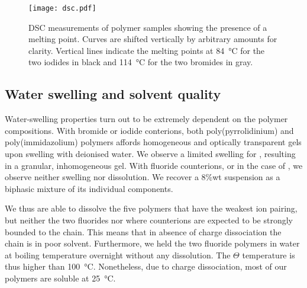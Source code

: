 \documentclass[journal=jacsat,manuscript=article]{achemso}
\begin{document}
\begin{figure}
\texttt{[image: dsc.pdf]}
\caption{DSC measurements of polymer samples showing the presence of a melting point. Curves are shifted vertically by arbitrary amounts for clarity. Vertical lines indicate the melting points at \SI{84}{\celsius} for the two iodides in black and \SI{114}{\celsius} for the two bromides in gray.}
\label{fig:dsc}
\end{figure}

\subsection{Water swelling and solvent quality}
Water-swelling properties turn out to be extremely dependent on the polymer compositions. With bromide or iodide conterions, both poly(pyrrolidinium) and poly(immidazolium) polymers affords homogeneous and optically transparent gels upon swelling with deionised water. We observe a limited swelling for , resulting in a granular, inhomogeneous gel. With fluoride counterions, or in the case of , we observe neither swelling nor dissolution. We recover a 8\%wt suspension as a biphasic mixture of its individual components.

We thus are able to dissolve the five polymers that have the weakest ion pairing, but neither the two fluorides nor  where counterions are expected to be strongly bounded to the chain. This means that in absence of charge dissociation the chain is in poor solvent. Furthermore, we held the two fluoride polymers in water at boiling temperature overnight without any dissolution. The $\Theta$ temperature is thus higher than \SI{100}{\celsius}. Nonetheless, due to charge dissociation, most of our polymers are soluble at \SI{25}{\celsius}.


\end{document}
